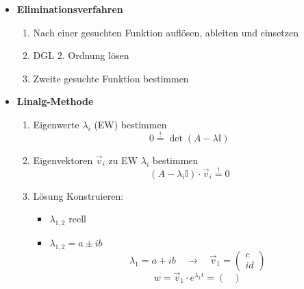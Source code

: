     \begin{itemize}
        \item \textbf{Eliminationsverfahren}
            \begin{enumerate}
                \item Nach einer gesuchten Funktion auflösen, ableiten und einsetzen
                \item DGL 2. Ordnung lösen
                \item Zweite gesuchte Funktion bestimmen
            \end{enumerate}
        \item \textbf{Linalg-Methode}
            \begin{enumerate}
                \item Eigenwerte $\lambda_i$ (EW) bestimmen
                    $$
                        0 \overset{!}{=} \det (A - \lambda \mathbb{I})
                    $$
                \item Eigenvektoren $\vec{v}_i$ zu EW $\lambda_i$ bestimmen
                    $$
                        (A - \lambda_i \mathbb{I}) \cdot \vec{v}_i \overset{!}{=} 0
                    $$
                \item Lösung Konstruieren:
                \begin{itemize}
                    \item $\lambda_{1,2}$ reell
                    \item $\lambda_{1,2} = a \pm ib$ 
                        $$
                            \lambda_{1} = a + ib \quad \to \quad \vec{v}_1 =
                            \begin{pmatrix}
                                c\\id
                            \end{pmatrix}
                        $$
                        $$
                            w = 
                            \vec{v}_1 \cdot e^{\lambda_1 t}
                            =
                            \begin{pmatrix}

\end{pmatrix}$$
\end{itemize}
\end{enumerate}
\end{itemize}
